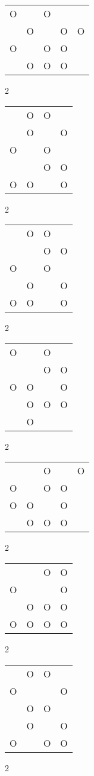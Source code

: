\begin{tabular}{|m{0.2cm}m{0.2cm}m{0.2cm}m{0.2cm}m{0.2cm}|}\hline
O& &O& & \\
 &O& &O&O\\
O& &O&O& \\
 &O&O&O& \\
\hline\end{tabular}2
\begin{tabular}{|m{0.2cm}m{0.2cm}m{0.2cm}m{0.2cm}|}\hline
 &O&O& \\
 &O& &O\\
O& &O& \\
 & &O&O\\
O&O& &O\\
\hline\end{tabular}2
\begin{tabular}{|m{0.2cm}m{0.2cm}m{0.2cm}m{0.2cm}|}\hline
 &O&O& \\
 & &O&O\\
O& &O& \\
 &O& &O\\
O&O& &O\\
\hline\end{tabular}2
\begin{tabular}{|m{0.2cm}m{0.2cm}m{0.2cm}m{0.2cm}|}\hline
O& &O& \\
 & &O&O\\
O&O& &O\\
 &O&O&O\\
 &O& & \\
\hline\end{tabular}2
\begin{tabular}{|m{0.2cm}m{0.2cm}m{0.2cm}m{0.2cm}m{0.2cm}|}\hline
 & &O& &O\\
O& &O&O& \\
O&O& &O& \\
 &O&O&O& \\
\hline\end{tabular}2
\begin{tabular}{|m{0.2cm}m{0.2cm}m{0.2cm}m{0.2cm}|}\hline
 & &O&O\\
O& & &O\\
 &O&O&O\\
O&O&O&O\\
\hline\end{tabular}2
\begin{tabular}{|m{0.2cm}m{0.2cm}m{0.2cm}m{0.2cm}|}\hline
 &O&O& \\
O& & &O\\
 &O&O& \\
 &O& &O\\
O& &O&O\\
\hline\end{tabular}2
